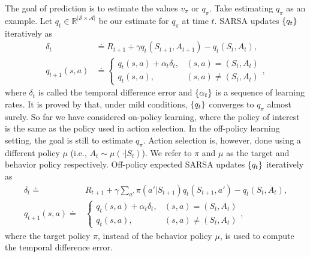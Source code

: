 \documentclass[twoside,11pt]{article}
\newcommand{\fS}{\mathcal{S}}
\newcommand{\fA}{\mathcal{A}}
\newcommand{\R}{\mathbb{R}}
\newcommand{\nsa}{{|\fS \times \fA|}}
\numberwithin{assucounter}{section}
\begin{document}
The goal of prediction is to estimate the values $v_\pi$ or $q_\pi$.
Take estimating $q_\pi$ as an example.
Let $q_t \in \R^\nsa$ be our estimate for $q_\pi$ at time $t$.
SARSA \citep{rummery1994line} updates $\qty{q_t}$ iteratively as
\begin{align}
  \delta_t &\doteq R_{t+1} + \gamma q_{t}(S_{t+1}, A_{t+1}) - q_t(S_t, A_t), \\
  \label{eq on-policy sarsa}
  q_{t+1}(s, a) &\doteq 
  \begin{cases}
    q_t(s, a) + \alpha_t \delta_t, & (s ,a) = (S_t, A_t) \\
    q_t(s, a), & (s, a) \neq (S_t, A_t)
  \end{cases},
\end{align}
where $\delta_t$ is called the temporal difference error \citep{sutton1988learning} and $\qty{\alpha_t}$ is a sequence of learning rates.
It is proved by \cite{bertsekas1996neuro} that, under mild conditions, $\qty{q_t}$ converges to $q_\pi$ almost surely.
So far we have considered on-policy learning,
where the policy of interest is the same as the policy used in action selection.
In the off-policy learning setting, 
the goal is still to estimate $q_\pi$.
Action selection is, however,
done using a different policy $\mu$ (i.e., $A_t \sim \mu(\cdot |S_t)$).
We refer to $\pi$ and $\mu$ as the target and behavior policy respectively.
Off-policy expected SARSA \citep{de2018multi} updates $\qty{q_t}$ iteratively as
\begin{align}
  \delta_t \doteq& R_{t+1} + \gamma \sum_{a'} \pi(a' | S_{t+1}) q_{t}(S_{t+1}, a') - q_t(S_t, A_t), \\
  \label{eq off-policy esarsa}
  q_{t+1}(s, a) \doteq &
  \begin{cases}
    q_t(s, a) + \alpha_t \delta_t, & (s ,a) = (S_t, A_t) \\
    q_t(s, a), & (s, a) \neq (S_t, A_t)
  \end{cases},
\end{align}
where the target policy $\pi$,
instead of the behavior policy $\mu$,
is used to compute the temporal difference error.
\end{document}
